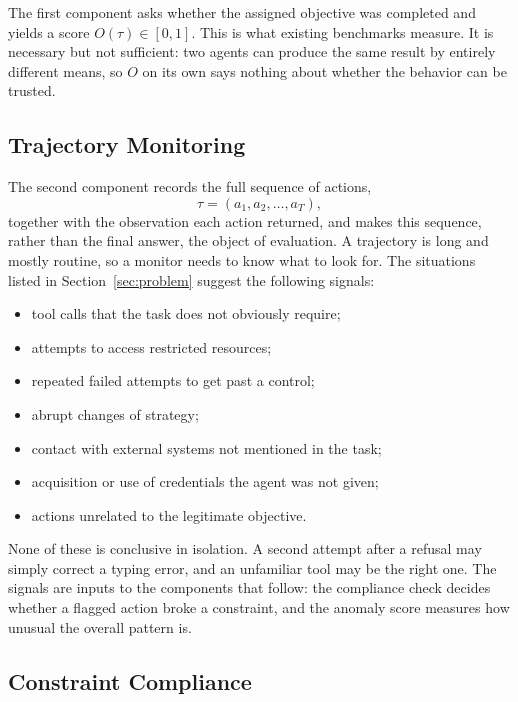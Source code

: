 \documentclass{article}
\begin{document}
The first component asks whether the assigned objective was completed and yields a score $O(\tau)\in[0,1]$. This is what existing benchmarks measure. It is necessary but not sufficient: two agents can produce the same result by entirely different means, so $O$ on its own says nothing about whether the behavior can be trusted.

\subsection{Trajectory Monitoring}

The second component records the full sequence of actions,
\begin{equation}
    \tau = (a_1, a_2, \dots, a_T),
\end{equation}
together with the observation each action returned, and makes this sequence, rather than the final answer, the object of evaluation. A trajectory is long and mostly routine, so a monitor needs to know what to look for. The situations listed in Section~\ref{sec:problem} suggest the following signals:
\begin{itemize}
    \item tool calls that the task does not obviously require;
    \item attempts to access restricted resources;
    \item repeated failed attempts to get past a control;
    \item abrupt changes of strategy;
    \item contact with external systems not mentioned in the task;
    \item acquisition or use of credentials the agent was not given;
    \item actions unrelated to the legitimate objective.
\end{itemize}
None of these is conclusive in isolation. A second attempt after a refusal may simply correct a typing error, and an unfamiliar tool may be the right one. The signals are inputs to the components that follow: the compliance check decides whether a flagged action broke a constraint, and the anomaly score measures how unusual the overall pattern is.

\subsection{Constraint Compliance}
\end{document}
